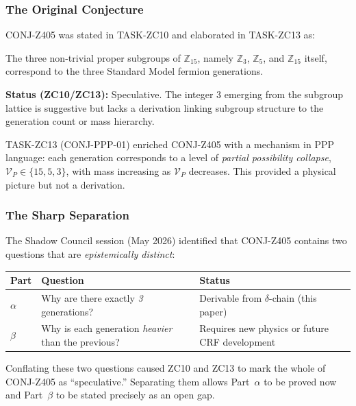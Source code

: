 \documentclass[12pt, a4paper]{article}
\begin{document}
\subsubsection{The Original Conjecture}

CONJ-Z405 was stated in TASK-ZC10 and elaborated in TASK-ZC13 as:

\begin{formalbox}[title={CONJ-Z405 (Original Statement, ZC10/ZC13)}]
The three non-trivial proper subgroups of $\mathbb{Z}_{15}$,
namely $\mathbb{Z}_3$, $\mathbb{Z}_5$, and $\mathbb{Z}_{15}$
itself, correspond to the three Standard Model fermion generations.

\textbf{Status (ZC10/ZC13):} Speculative. The integer 3 emerging
from the subgroup lattice is suggestive but lacks a derivation
linking subgroup structure to the generation count or mass hierarchy.
\end{formalbox}

TASK-ZC13 (CONJ-PPP-01) enriched CONJ-Z405 with a mechanism in
PPP language: each generation corresponds to a level of
\emph{partial possibility collapse},
$\mathcal{V}_P \in \{15, 5, 3\}$, with mass increasing as
$\mathcal{V}_P$ decreases. This provided a physical picture but
not a derivation.

\subsubsection{The Sharp Separation}

The Shadow Council session (May 2026) identified that CONJ-Z405
contains two questions that are \emph{epistemically distinct}:

\begin{center}
{\small
\renewcommand{\arraystretch}{1.30}
\begin{tabular}{p{1.8cm} p{5.5cm} p{5.5cm}}
\toprule
\textbf{Part} & \textbf{Question} & \textbf{Status} \\
\midrule
$\alpha$ & Why are there exactly \emph{3} generations?
  & Derivable from $\delta$-chain (this paper) \\
$\beta$ & Why is each generation \emph{heavier} than the previous?
  & Requires new physics or future CRF development \\
\bottomrule
\end{tabular}
}
\end{center}

Conflating these two questions caused ZC10 and ZC13 to mark
the whole of CONJ-Z405 as ``speculative.'' Separating them allows
Part~$\alpha$ to be proved now and Part~$\beta$ to be stated
precisely as an open gap.
\end{document}
